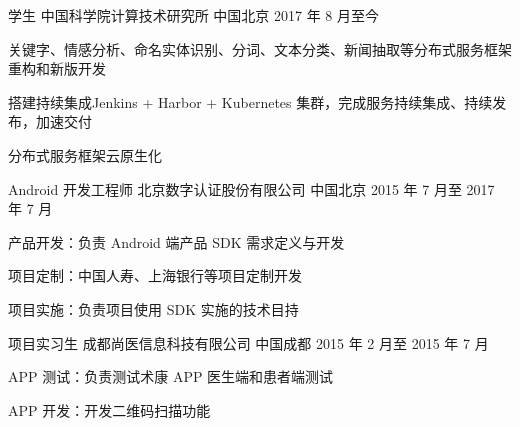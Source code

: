 

\begin{cventries}

  \cventry
    {学生} %
    {中国科学院计算技术研究所} %
    {中国北京} %
    {2017 年 8 月至今} %
    {
      \begin{cvitems} %
        \item 关键字、情感分析、命名实体识别、分词、文本分类、新闻抽取等分布式服务框架重构和新版开发
        \item 搭建持续集成Jenkins + Harbor + Kubernetes 集群，完成服务持续集成、持续发布，加速交付
        \item 分布式服务框架云原生化
      \end{cvitems}
    }

  \cventry
    {Android 开发工程师} %
    {北京数字认证股份有限公司} %
    {中国北京} %
    {2015 年 7 月至 2017 年 7 月} %
    {
      \begin{cvitems} %
        \item 产品开发：负责 Android 端产品 SDK 需求定义与开发
        \item 项目定制：中国人寿、上海银行等项目定制开发
        \item 项目实施：负责项目使用 SDK 实施的技术目持
      \end{cvitems}
    }

  \cventry
    {项目实习生} %
    {成都尚医信息科技有限公司} %
    {中国成都} %
    {2015 年 2 月至 2015 年 7 月} %
    {
      \begin{cvitems} %
        \item APP 测试：负责测试术康 APP 医生端和患者端测试
        \item APP 开发：开发二维码扫描功能
      \end{cvitems}
    }

\end{cventries}
